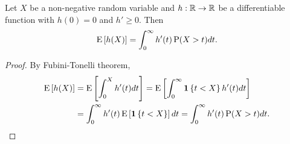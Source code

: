 \begin{lemma}\label{lem:expectation_tail_prob}
    Let $X$ be a non-negative random variable and $h:\mathbb{R}\to\mathbb{R}$ be a differentiable 
    function with $h(0)=0$ and $h'\geq 0$. Then 
    \begin{equation*}
        \operatorname{E}\left[ {h(X)} \right] = \int_0^\infty h'(t)\operatorname{P}(X>t)dt. 
    \end{equation*}
\end{lemma}
\begin{proof}
    By Fubini-Tonelli theorem, 
    \begin{equation*}
        \begin{split}
            \operatorname{E}\left[ {h(X)} \right] &= \operatorname{E}\left[ {\int_0^X h'(t)dt} \right] 
            = \operatorname{E}\left[ {\int_0^\infty\mathbf{1}\left\{ {t<X} \right\}h'(t)dt} \right] \\
            &= \int_0^\infty h'(t)\operatorname{E}\left[ {\mathbf{1}\left\{ {t<X} \right\}} \right]dt 
            = \int_0^\infty h'(t)\operatorname{P}(X>t)dt. 
        \end{split}
    \end{equation*}
\end{proof}


